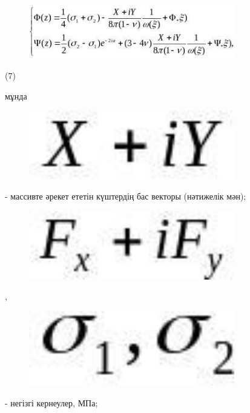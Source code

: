 \begin{figure}[H]
	\centering
	\includegraphics[width=0.8\textwidth]{assets/1282}
	\caption*{}
\end{figure} (7)

мұнда \begin{figure}[H]
	\centering
	\includegraphics[width=0.8\textwidth]{assets/1283}
	\caption*{}
\end{figure} - массивте әрекет ететін
күштердің бас векторы (нәтижелік мән);

\begin{figure}[H]
	\centering
	\includegraphics[width=0.8\textwidth]{assets/1284}
	\caption*{}
\end{figure},
\begin{figure}[H]
	\centering
	\includegraphics[width=0.8\textwidth]{assets/1285}
	\caption*{}
\end{figure} - негізгі кернеулер, МПа;

